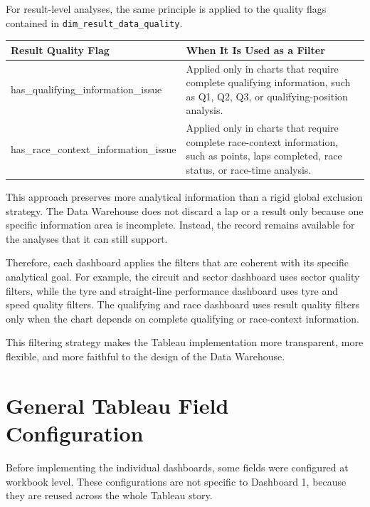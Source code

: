 \documentclass[12pt,a4paper]{article}
\begin{document}
	For result-level analyses, the same principle is applied to the quality flags contained in
	\texttt{dim\_result\_data\_quality}.
	
	\begin{longtable}{p{6cm} p{8cm}}
		\toprule
		\textbf{Result Quality Flag} & \textbf{When It Is Used as a Filter} \\
		\midrule
		
		\small{has\_qualifying\_information\_issue}
		& Applied only in charts that require complete qualifying information, such as Q1, Q2, Q3, or qualifying-position analysis. \\
		
		\footnotesize{has\_race\_context\_information\_issue}
		& Applied only in charts that require complete race-context information, such as points, laps completed, race status, or race-time analysis. \\
		
		\bottomrule
	\end{longtable}
	
	This approach preserves more analytical information than a rigid global exclusion strategy.
	The Data Warehouse does not discard a lap or a result only because one specific information area is incomplete.
	Instead, the record remains available for the analyses that it can still support.
	
	Therefore, each dashboard applies the filters that are coherent with its specific analytical goal.
	For example, the circuit and sector dashboard uses sector quality filters, while the tyre and straight-line performance dashboard uses tyre and speed quality filters.
	The qualifying and race dashboard uses result quality filters only when the chart depends on complete qualifying or race-context information.
	
	This filtering strategy makes the Tableau implementation more transparent, more flexible, and more faithful to the design of the Data Warehouse.
	
	
	\section{General Tableau Field Configuration}
	
	Before implementing the individual dashboards, some fields were configured at workbook level.
	These configurations are not specific to Dashboard 1, because they are reused across the whole Tableau story.
	
\end{document}
